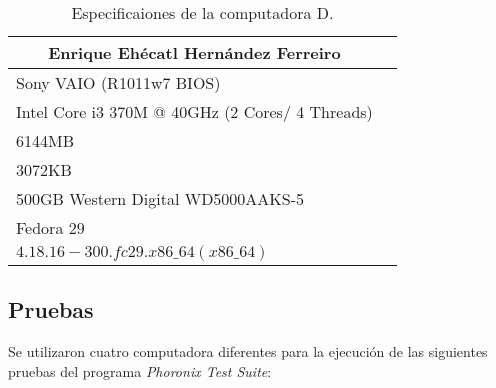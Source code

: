 \documentclass[12pt, letterpaper]{article}
\begin{document}
                                \begin{table}[htb]
                                        \centering
                                        \begin{tabular}{|l|l|}
                                        \hline
                                                \multicolumn{1}{|c|}{Enrique Ehécatl Hernández Ferreiro} \\ 
                                                \hline \hline
                                                Sony VAIO (R1011w7 BIOS)  \\
                                                Intel Core i3 370M @ 40GHz (2 Cores/ 4 Threads) \\ 
                                                6144MB \\ 
                                                3072KB \\
                                                500GB Western Digital WD5000AAKS-5 \\
                                                Fedora $29$ \\ 
                                                $4.18.16-300.fc29.x86\_64(x86\_64)$ \\ 
                                                \hline
                                        \end{tabular}
                                        \caption{Especificaiones de la computadora D.}
                                \end{table}

                \subsection{Pruebas}

                        \hspace{.5cm}
                        Se utilizaron cuatro computadora diferentes para la
                        ejecución de las siguientes pruebas del programa 
                        \textit{Phoronix Test Suite}:\vspace{.3cm}
\end{document}
